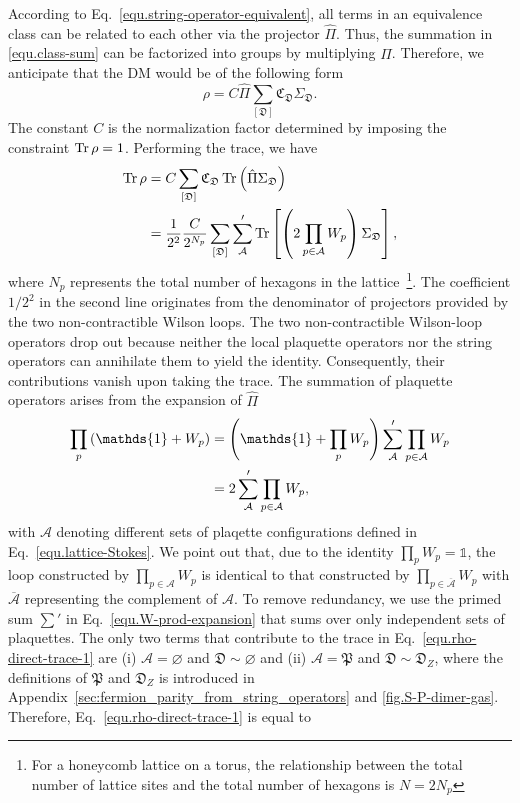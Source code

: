 According to Eq.~\eqref{equ.string-operator-equivalent}, all terms in an equivalence class can be related to each other via the projector $\hat{\Pi}$. Thus, the summation in \eqref{equ.class-sum} can be factorized into groups by multiplying $\hat{\Pi}$. Therefore, we anticipate that the DM would be of the following form
\begin{equation}\label{equ.rho-factorization}
    \rho = C \hat{\Pi} \sum_{[\mathfrak{D}]} \mathfrak{C}_{\mathfrak{D}} \Sigma_{\mathfrak{D}}.
\end{equation}
The constant $C$ is the normalization factor determined by imposing the constraint $\Tr\rho = 1$. Performing the trace, we have 
\begin{align}\label{equ.rho-direct-trace-1}
    \Tr\rho &= {C} \sum_{[\mathfrak{D}]} \mathfrak{C}_{\mathfrak{D}} \Tr\left( \hat{\Pi}\Sigma_{\mathfrak{D}} \right) \nonumber\\
    &= {\frac{1}{2^2}}\frac{C}{2^{N_p}} \sum_{[\mathfrak{D}]} \sum_{\mathcal{A}}'\Tr\left[  \left( 2\prod_{p\in\mathcal{A}} W_p \right)\Sigma_{\mathfrak{D}} \right],
\end{align}
{where $N_p$ represents the total number of hexagons in the lattice~\footnote{For a honeycomb lattice on a torus, the relationship between the total number of lattice sites and the total number of hexagons is $N = 2N_p$}.} The coefficient $1/2^2$ in the {second} line originates from the denominator of projectors provided by the two non-contractible Wilson loops. The two non-contractible Wilson-loop operators drop out because neither the local plaquette operators nor the string operators can annihilate them to yield the identity. Consequently, their contributions vanish upon taking the trace. The summation of plaquette operators arises from the expansion of $\hat{\Pi}$
\begin{align}\label{equ.W-prod-expansion}
    \prod_{p}\lr{\mathds{1}+W_p} &= \lr{\mathds{1}+\prod_{p}W_p}\sum'_{\mathcal{A}}\prod_{p\in\mathcal{A}}W_p \nonumber\\
    &= 2\sum'_{\mathcal{A}}\prod_{p\in\mathcal{A}}W_p,
\end{align}
with $\mathcal{A}$ denoting different sets of plaqette configurations defined in Eq.~\eqref{equ.lattice-Stokes}. We point out that, due to the identity $\prod_{p}W_p=\mathds{1}$, the loop constructed by $\prod_{p\in \mathcal{A}}W_p$ is identical to that constructed by $\prod_{p\in \overline{\mathcal{A}}}W_p$ with $\overline{\mathcal{A}}$ representing the complement of $\mathcal{A}$. To remove redundancy, we use the primed sum $\sum'$ in Eq.~\eqref{equ.W-prod-expansion} that sums over only independent sets of plaquettes. The only two terms that contribute to the trace in Eq.~\eqref{equ.rho-direct-trace-1} are (i) $\mathcal{A}=\varnothing$ and $\mathfrak{D}\sim \varnothing$ and (ii) $\mathcal{A}=\mathfrak{P}$ and $\mathfrak{D}\sim\mathfrak{D}_Z$, where the definitions of $\mathfrak{P}$ and $\mathfrak{D}_Z$ is introduced in Appendix~\ref{sec:fermion_parity_from_string_operators} and \autoref{fig.S-P-dimer-gas}. Therefore, Eq.~\eqref{equ.rho-direct-trace-1} is equal to 
